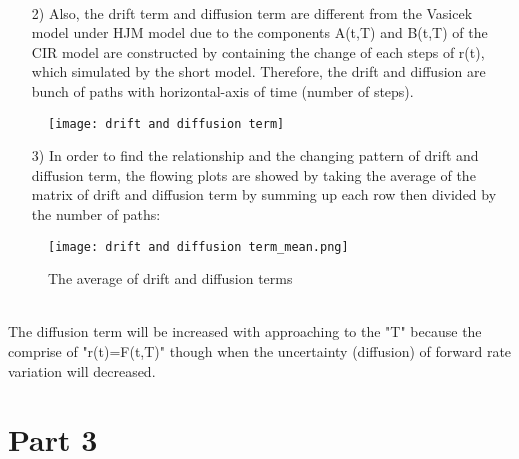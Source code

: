 \documentclass[14pt]{extarticle}
\begin{document}
~\\

\begin{itemize}
    \item [2)]Also, the drift term and diffusion term are different from the Vasicek model under HJM model due to the components A(t,T) and B(t,T) of the CIR model are constructed by containing the change of each steps of r(t), which simulated by the short model. Therefore, the drift and diffusion are bunch of paths with horizontal-axis of time (number of steps).
\end{itemize}

\begin{figure}[H]
	\begin{minipage}[t]{0.8\textwidth}
		\centering
		\texttt{[image: drift and diffusion term]}
		\caption{\label{fig:1}}
	\end{minipage}
\end{figure}




\newpage
\begin{itemize}
    \item [3)] In order to find the relationship and the changing pattern of drift and diffusion term, the flowing plots are showed by taking the average of the matrix of drift and diffusion term by summing up each row then divided by the number of paths:
\end{itemize}
\begin{figure}[H]
	\begin{minipage}[t]{0.8\textwidth}
		\centering
		\texttt{[image: drift and diffusion term\_mean.png]}
		\caption{The average of drift and diffusion terms\label{fig:1}}
	\end{minipage}
\end{figure}
~\\
The diffusion term will be increased with approaching to the "T" because the comprise of "r(t)=F(t,T)" though when the uncertainty (diffusion) of forward rate variation will decreased.
~\\

\section{Part 3}
\end{document}
